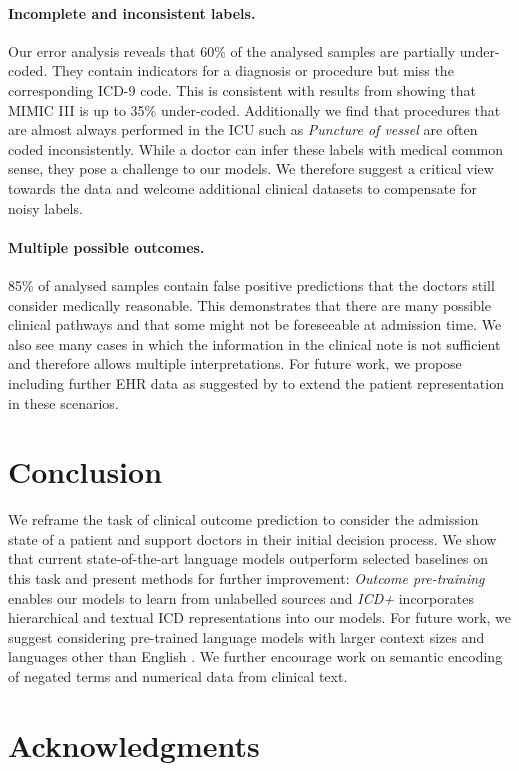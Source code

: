 \documentclass[11pt,a4paper]{article}
\begin{document}
\paragraph{Incomplete and inconsistent labels.} Our error analysis reveals that 60\% of the analysed samples are partially under-coded. They contain indicators for a diagnosis or procedure but miss the corresponding ICD-9 code. This is consistent with results from \citet{silver_mimic} showing that MIMIC III is up to 35\% under-coded. Additionally we find that procedures that are almost always performed in the ICU such as \textit{Puncture of vessel} are often coded inconsistently. While a doctor can infer these labels with medical common sense, they pose a challenge to our models. We therefore suggest a critical view towards the data and welcome additional clinical datasets to compensate for noisy labels.

\paragraph{Multiple possible outcomes.} 85\% of analysed samples contain false positive predictions that the doctors still consider medically reasonable. This demonstrates that there are many possible clinical pathways and that some might not be foreseeable at admission time. We also see many cases in which the information in the clinical note is not sufficient and therefore allows multiple interpretations. For future work, we propose including further EHR data as suggested by \citet{notes-timeseries} to extend the patient representation in these scenarios. \section{Conclusion}
We reframe the task of clinical outcome prediction to consider the admission state of a patient and support doctors in their initial decision process. We show that current state-of-the-art language models outperform selected baselines on this task and present methods for further improvement: \textit{Outcome pre-training} enables our models to learn from unlabelled sources and \textit{ICD+} incorporates hierarchical and textual ICD representations into our models. For future work, we suggest considering pre-trained language models with larger context sizes \cite{longformer,big-bird} and languages other than English \cite{brazilian-notes}. We further encourage work on semantic encoding of negated terms and numerical data from clinical text. 
\section*{Acknowledgments}
\end{document}
